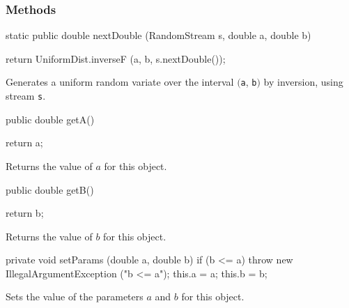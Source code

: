 \subsubsection* {Methods}
\begin{code}

   static public double nextDouble (RandomStream s, double a, double b) \begin{hide} {
      return UniformDist.inverseF (a, b, s.nextDouble());
   }\end{hide}
\end{code}
\begin{tabb} 
  Generates a uniform random variate over the interval 
  $($\texttt{a}, \texttt{b}$)$ by inversion, using stream \texttt{s}.
\end{tabb}
\begin{code}      

   public double getA()\begin{hide} {
      return a;
   }\end{hide}
\end{code}
  \begin{tabb}
  Returns the value of $a$ for this object.
 \end{tabb}
\begin{code}      

   public double getB()\begin{hide} {
      return b;
   }\end{hide}
\end{code}
  \begin{tabb}
  Returns the value of $b$ for this object.
 \end{tabb}
\begin{hide}\begin{code}      

   private void setParams (double a, double b) {
      if (b <= a)
         throw new IllegalArgumentException ("b <= a");
      this.a = a;
      this.b = b;
   }
\end{code}
\begin{tabb}
  Sets the value of the parameters $a$ and $b$ for this object.
\end{tabb}
\begin{code}      
}
\end{code}
\end{hide}
